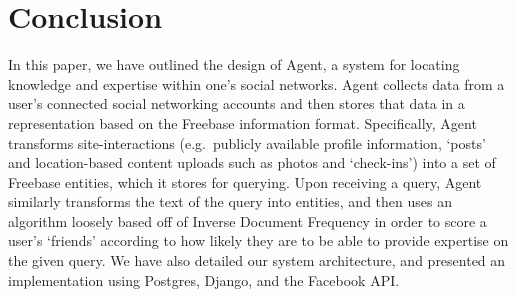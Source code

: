 \documentclass[11pt]{article}
\begin{document}
\section{Conclusion}
\label{sec:conclusion}
In this paper, we have outlined the design of Agent, a system for locating
knowledge and expertise within one's social networks. Agent collects data from a
user's connected social networking accounts and then stores that data in a
representation based on the Freebase information format. Specifically, Agent
transforms site-interactions (e.g.\ publicly available profile information,
`posts' and location-based content uploads such as photos and `check-ins') into
a set of Freebase entities, which it stores for querying. Upon receiving a
query, Agent similarly transforms the text of the query into entities, and then
uses an algorithm loosely based off of Inverse Document Frequency in order to
score a user's `friends' according to how likely they are to be able to provide
expertise on the given query. We have also detailed our system architecture, and
presented an implementation using Postgres, Django, and the Facebook API.



\end{document}
